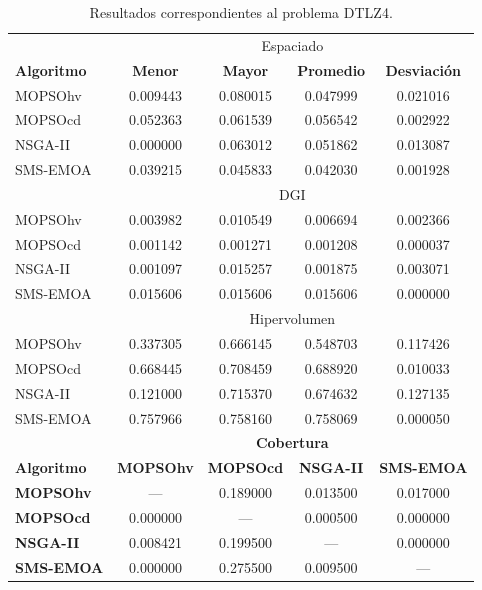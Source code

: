 \begin{table}
 \begin{center}
  \begin{tabular}{|l|cc|cc|} \hline
    & \multicolumn{4}{|c|}{Espaciado} \\ 
	\textbf{Algoritmo} & \textbf{Menor} & \textbf{Mayor} & \textbf{Promedio} & \textbf{Desviaci\'on} \\  \hline \hline
	MOPSOhv &0.009443 & 0.080015 & 0.047999 & 0.021016    \\ 
	MOPSOcd &0.052363 & 0.061539 & 0.056542 & 0.002922  \\ 
	NSGA-II &0.000000 & 0.063012 & 0.051862 & 0.013087   \\  
	SMS-EMOA & 0.039215 & 0.045833 & 0.042030 & 0.001928   \\  
	\hline\hline
    & \multicolumn{4}{|c|}{DGI} \\ 
	\hline\hline
	MOPSOhv &0.003982 & 0.010549 & 0.006694 & 0.002366   \\ 
	MOPSOcd &0.001142 & 0.001271 & 0.001208 & 0.000037 \\ 
	NSGA-II &0.001097 & 0.015257 & 0.001875 & 0.003071   \\  
	SMS-EMOA &0.015606 & 0.015606 & 0.015606 & 0.000000   \\  
	\hline\hline
    & \multicolumn{4}{|c|}{Hipervolumen} \\ 
	\hline \hline
	MOPSOhv &0.337305 & 0.666145 & 0.548703 & 0.117426 \\ 
	MOPSOcd &0.668445 & 0.708459 & 0.688920 & 0.010033  \\ 
	NSGA-II &0.121000 & 0.715370 & 0.674632 & 0.127135  \\  
	SMS-EMOA &0.757966 & 0.758160 & 0.758069 & 0.000050   \\  
	\hline\hline
	& \multicolumn{4}{|c|}{\textbf{Cobertura}} \\ \hline\hline 
	\textbf{Algoritmo} & \textbf{MOPSOhv} & \textbf{MOPSOcd} & \textbf{NSGA-II} & \textbf{SMS-EMOA} \\  \hline \hline
	\textbf{MOPSOhv} &---       & 0.189000   & 0.013500   &  0.017000 \\ 
	\textbf{MOPSOcd} & 0.000000  & ---       & 0.000500   &  0.000000   \\ 
	\textbf{NSGA-II} & 0.008421  & 0.199500  & ---       &  0.000000  \\  
	\textbf{SMS-EMOA}&  0.000000 & 0.275500  & 0.009500 & --- \\  
	\hline
	\end{tabular}
\caption{Resultados correspondientes al problema DTLZ4.}
  \label{tab:dtlz4}
\end{center}
\end{table}

